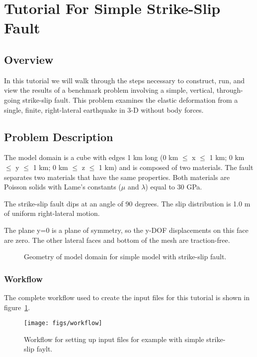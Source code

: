 \section{Tutorial For Simple Strike-Slip Fault}

\subsection{Overview}

In this tutorial we will walk through the steps necessary to
construct, run, and view the results of a benchmark problem involving
a simple, vertical, through-going strike-slip fault. This problem
examines the elastic deformation from a single, finite, right-lateral
earthquake in 3-D without body forces.

\subsection{Problem Description}

The model domain is a cube with edges 1 km long (0 km $\leq$ x $\leq$
1 km; 0 km $\leq$ y $\leq$ 1 km; 0 km $\leq$ z $\leq$ 1 km) and is
composed of two materials. The fault separates two materials that have
the same properties. Both materials are Poisson solids with Lame's
constants ($\mu$ and $\lambda$) equal to 30 GPa.

The strike-slip fault dips at an angle of 90 degrees. The slip
distribution is 1.0 m of uniform right-lateral motion.

The plane y=0 is a plane of symmetry, so the y-DOF displacements on
this face are zero. The other lateral faces and bottom of the mesh are
traction-free.

\begin{figure}
  \begin{center}
    \caption{Geometry of model domain for simple model with strike-slip fault.}
  \end{center}
\end{figure}  

\subsubsection{Workflow}

The complete workflow used to create the input files for this tutorial
is shown in figure~\ref{fig:splittest:workflow}. 

\begin{figure}[htbp]
  \begin{center}
    \texttt{[image: figs/workflow]}
    \caption{Workflow for setting up input files for example with
      simple strike-slip faylt.}
    \label{fig:splittest:workflow}
  \end{center}
\end{figure}


